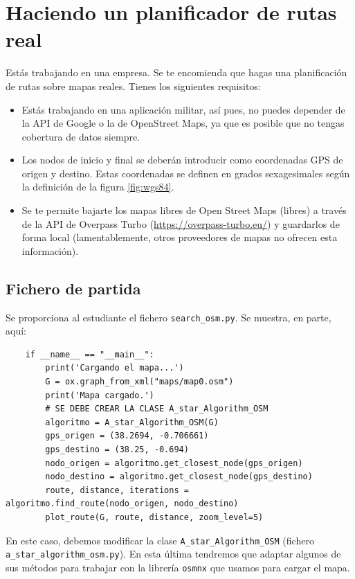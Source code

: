 \documentclass{article}
\begin{document}
\section{Haciendo un planificador de rutas real}
Estás trabajando en una empresa. Se te encomienda que hagas una planificación de rutas sobre mapas reales. Tienes los siguientes requisitos:
\begin{itemize}
    \item Estás trabajando en una aplicación militar, así pues, no puedes depender de la API de Google o la de OpenStreet Maps, ya que es posible que no tengas cobertura de datos siempre.
    \item Los nodos de inicio y final se deberán introducir como coordenadas GPS de origen y destino. Estas coordenadas se definen en grados sexagesimales según la definición de la figura \ref{fig:wgs84}.
    \item Se te permite bajarte los mapas libres de Open Street Maps (libres) a través de la API de Overpass Turbo (\url{https://overpass-turbo.eu/}) y guardarlos de forma local (lamentablemente, otros proveedores de mapas no ofrecen esta información).
\end{itemize}

\subsection{Fichero de partida}
Se proporciona al estudiante el fichero \texttt{search\_osm.py}. Se muestra, en parte, aquí:
\begin{verbatim}
    if __name__ == "__main__":
        print('Cargando el mapa...')
        G = ox.graph_from_xml("maps/map0.osm")
        print('Mapa cargado.')
        # SE DEBE CREAR LA CLASE A_star_Algorithm_OSM
        algoritmo = A_star_Algorithm_OSM(G)        
        gps_origen = (38.2694, -0.706661)
        gps_destino = (38.25, -0.694)
        nodo_origen = algoritmo.get_closest_node(gps_origen)
        nodo_destino = algoritmo.get_closest_node(gps_destino)    
        route, distance, iterations = algoritmo.find_route(nodo_origen, nodo_destino)
        plot_route(G, route, distance, zoom_level=5)
\end{verbatim}

En este caso, debemos modificar la clase  \texttt{A\_star\_Algorithm\_OSM} (fichero \texttt{a\_star\_algorithm\_osm.py}). En esta última tendremos que adaptar algunos de sus métodos para trabajar con la librería \texttt{osmnx} que usamos para cargar el mapa.
\end{document}
